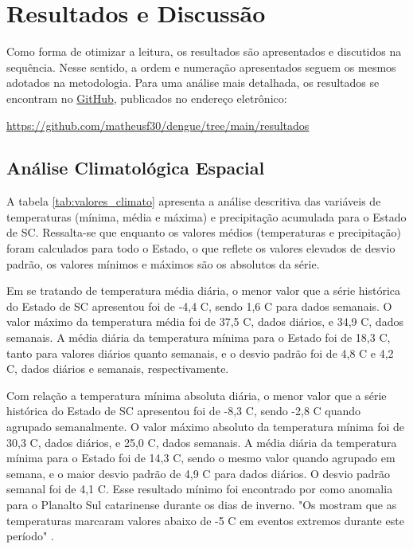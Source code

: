 \chapter{Resultados e Discussão} \label{Resultados e Discussão}

\indent Como forma de otimizar a leitura, os resultados são apresentados e discutidos na sequência. Nesse sentido, a ordem e  numeração apresentados seguem os mesmos adotados na metodologia. Para uma análise  mais detalhada, os resultados se encontram no \href{https://github.com/matheusf30/dengue/tree/main/resultados}{GitHub}, publicados no endereço eletrônico:
\begin{center}
\url{https://github.com/matheusf30/dengue/tree/main/resultados}
\end{center}

\section{Análise Climatológica Espacial}

\indent A tabela \ref{tab:valores_climato} apresenta a análise descritiva das variáveis de temperaturas (mínima, média e máxima) e precipitação acumulada para o Estado de \acrlong{SC}. Ressalta-se que enquanto os valores médios (temperaturas e precipitação) foram calculados para todo o Estado, o que reflete os valores elevados de desvio padrão, os valores mínimos e máximos são os absolutos da série.

\indent Em se tratando de temperatura média diária, o menor valor que a série histórica do Estado de \acrlong{SC} apresentou foi de -4,4 C, sendo 1,6 C para dados semanais. O valor máximo da temperatura média foi de 37,5 C, dados diários, e 34,9 C, dados semanais. A média diária da temperatura mínima para o Estado foi de 18,3 C, tanto para valores diários quanto semanais, e o desvio padrão foi de 4,8 C e 4,2 C, dados diários e semanais, respectivamente. 

\indent Com relação a temperatura mínima absoluta diária, o menor valor que a série histórica do Estado de \acrlong{SC} apresentou foi de -8,3 C, sendo -2,8 C quando agrupado semanalmente. O valor máximo absoluto da temperatura mínima foi de 30,3 C, dados diários, e 25,0 C, dados semanais. A média diária da temperatura mínima para o Estado foi de 14,3 C, sendo o mesmo valor quando agrupado em semana, e o maior desvio padrão de 4,9 C para dados diários. O desvio padrão semanal foi de 4,1 C. Esse resultado mínimo foi encontrado por  como anomalia para o Planalto Sul catarinense durante os dias de inverno. "Os  mostram que as temperaturas marcaram valores abaixo de -5 C em eventos extremos durante este período" \cite{Guerra2023Regionalizacao}.  

